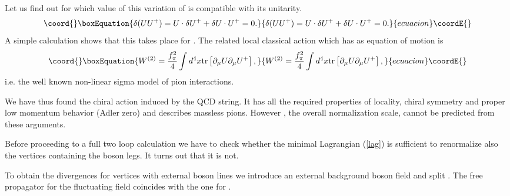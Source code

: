 \documentclass[a4paper,12pt]{article}
\begin{document}
Let us find out for which value of \coordHE{} this variation of \coordHE{} is 
compatible with 
its unitarity.
\begin{equation}\coord{}\boxEquation{
\delta (U U^+)= U \cdot\delta U^+ + \delta U\cdot U^+ = 0. \label{unit}
}{
\delta (U U^+)= U \cdot\delta U^+ + \delta U\cdot U^+ = 0. }{ecuacion}\coordE{}\end{equation}
A simple calculation shows that this
takes place for \coordHE{}. 
The related local classical action which 
has \coordHE{} as equation of motion is
\begin{equation}\coord{}\boxEquation{
W^{(2)} = \frac{f_\pi^2}{4}\int d^4 x \mbox{\rm tr}\left[\partial_\mu U
\partial_\mu U^+ \right], \label{weinb}
}{
W^{(2)} = \frac{f_\pi^2}{4}\int d^4 x \mbox{\rm tr}\left[\partial_\mu U
\partial_\mu U^+ \right], }{ecuacion}\coordE{}\end{equation}
i.e. the well known non-linear 
sigma model of  pion interactions.

We have thus found the chiral action induced by the QCD string.
It has all the required properties of locality, chiral symmetry 
and proper low momentum behavior (Adler zero) and describes
massless pions. However \coordHE{}, the overall normalization scale, cannot be
predicted from these arguments. 

Before proceeding to a full two loop calculation we have to check whether 
the minimal
Lagrangian (\ref{lag}) is sufficient to renormalize also the vertices containing
the boson legs.  It turns out that it is not.

To obtain the divergences for vertices with external boson lines
we introduce an external background boson field \coordHE{} 
and split \coordHE{}. 
The free propagator 
for the fluctuating field \myHighlight{$\eta_\mu $}\coordHE{} coincides with the one for  \coordHE{}.
\end{document}
